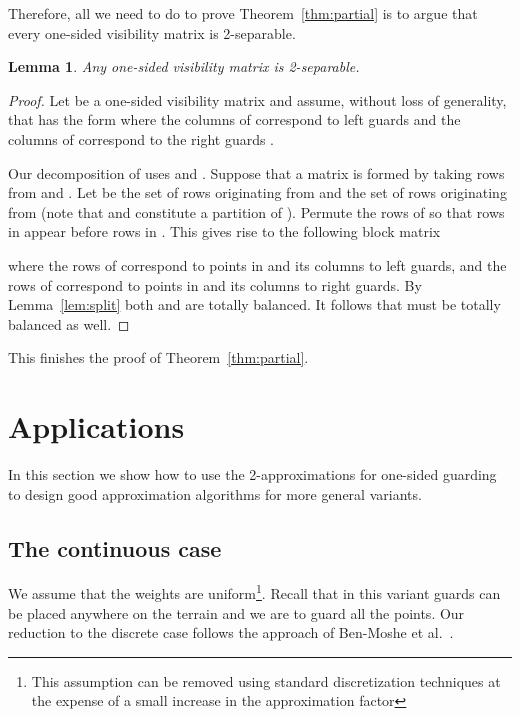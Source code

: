 \documentclass[11pt]{article}
\newcommand{\qed}{\hfill\bigskip}
\newtheorem{lemma}{Lemma}
\begin{document}
Therefore, all we need to do to prove Theorem~\ref{thm:partial} is to argue
that every one-sided visibility matrix is 2-separable.

\begin{lemma}
  Any one-sided visibility matrix is 2-separable.
\end{lemma}

\begin{proof}
  Let  be a one-sided visibility matrix and assume, without loss of
  generality, that  has the form  where the columns of 
  correspond to left guards  and the columns of  correspond to the right
  guards .

  Our decomposition of  uses  and . Suppose
  that a matrix  is formed by taking rows from  and . Let 
  be the set of rows originating from  and  the set of rows
  originating from  (note that  and  constitute a partition
  of ). Permute the rows of  so that rows in  appear before rows
  in . This gives rise to the following block matrix
  
  where the rows of  correspond to points in  and its columns to
  left guards, and the rows of  correspond to points in  and its
  columns to right guards. By Lemma~\ref{lem:split} both  and  are
  totally balanced. It follows that  must be totally balanced as well. \qed
\end{proof}

This finishes the proof of Theorem~\ref{thm:partial}.

\section{Applications}
\label{sec:applications}

In this section we show how to use the 2-approximations for one-sided guarding
to design good approximation algorithms for more general variants.

\subsection{The continuous case}

We assume that the weights are uniform\footnote{This assumption can be removed
  using standard discretization techniques at the expense of a small increase
  in the approximation factor}.  Recall that in this variant guards can be
placed anywhere on the terrain and we are to guard all the points. Our
reduction to the discrete case follows the approach of Ben-Moshe et
al.~\cite{journals/siamcomp/Ben-MosheKM07}.
\end{document}
